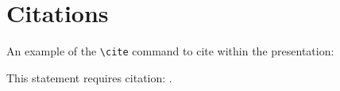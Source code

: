 \section{Citations}
\label{section3}

An example of the \texttt{\textbackslash cite} command to cite within the presentation:

This statement requires citation: \cite{deimeke2018}.

\clearpage